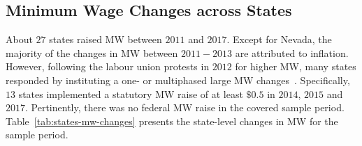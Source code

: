 \documentclass[12pt, english]{article}
\begin{document}
    \subsection{Minimum Wage Changes across States}\label{subsec:minimum-wage-changes-across-states}
    About $27$ states raised MW between $2011$ and $2017$. Except for Nevada, the majority of the changes in MW between $2011-2013$ are attributed to inflation. However, following the labour union protests in $2012$ for higher MW, many states responded by instituting a one- or multiphased large MW changes~\parencite{lathrop2021raises}. Specifically, $13$ states implemented a statutory MW raise of at least $\$0.5$ in $2014$, $2015$ and $2017$. Pertinently, there was no federal MW raise in the covered sample period. Table~\ref{tab:states-mw-changes} presents the state-level changes in MW for the sample period.
\end{document}
